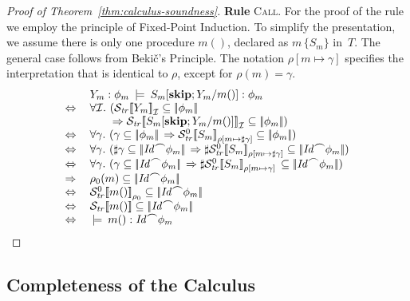 \documentclass[10pt,a4paper]{amsart}
\theoremstyle{definition}
\newcommand{\denot}[1]{\left[\!\left[#1\right]\!\right]}
\newcommand{\fdenot}[1]{\left|\!\left|#1\right|\!\right|}
\newcommand{\trcdenot}[1]{\mathcal{S}_{\mathit{tr}}\!\denot{#1}}
\newcommand{\trcdenoth}[1]{\mathcal{S}^0_{\mathit{tr}}\!\denot{#1}}
\newcommand{\trcdenoti}[1]{\mathcal{S}_{\mathit{tr}}\!\denot{#1}_{\mathcal{I}}}
\newcommand{\chop}[0]{\raisebox{1ex}{$\frown$}}
\newcommand{\Skip}{\mbox{\bf skip}}
\newcommand{\judge}[2]{#1 : #2}
\newcommand{\semsequent}[2]{#1 \>\models\> #2}
\begin{document}
\begin{proof}[Proof of Theorem~\ref{thm:calculus-soundness}]
\noindent\textbf{Rule} \textsc{Call}.
%
For the proof of the rule we employ the principle of Fixed-Point
Induction. %
%
To simplify the presentation, we assume there is only one procedure
$m()$, declared as $m\, \{S_m\}$ in~$T$.
%
The general case follows from Beki\v{c}'s Principle. The notation
$\rho [m\mapsto\gamma]$ specifies the interpretation that is identical
to $\rho$, except for $\rho(m)=\gamma$.
%
%
\[
  \begin{array}{ll}
   & 
   \semsequent{Y_m : \phi_m}{\judge{S_m [\Skip; Y_m / m()]}{\phi_m}} \\
   \Leftrightarrow\> & 
   \forall \mathcal{I}.\
                       (\trcdenoti{Y_m} \subseteq \fdenot{\phi_m}\,\\
    & \qquad\Rightarrow 
       \trcdenoti{S_m [\Skip; Y_m / m()]} \subseteq \fdenot{\phi_m}) \\
   \Leftrightarrow\> & 
   \forall \gamma.\
      (\gamma \subseteq \fdenot{\phi_m}\, \Rightarrow 
       \trcdenoth{S_m}_{\rho [m \mapsto \sharp \gamma]} 
       \subseteq \fdenot{\phi_m}) \\
   \Leftrightarrow\> & 
   \forall \gamma.\
      (\sharp \gamma \subseteq \fdenot{\mathit{Id} \chop \phi_m}\, \Rightarrow 
       \sharp \trcdenoth{S_m}_{\rho [m \mapsto \sharp \gamma]} 
       \subseteq \fdenot{\mathit{Id} \chop \phi_m}) \\
   \Leftrightarrow\> & 
   \forall \gamma.\
      (\gamma \subseteq \fdenot{\mathit{Id} \chop \phi_m}\, \Rightarrow 
       \sharp \trcdenoth{S_m}_{\rho [m \mapsto \gamma]}\, 
       \subseteq \fdenot{\mathit{Id} \chop \phi_m}) \\
   \Rightarrow\> & 
   \rho_0 (m) \subseteq \fdenot{\mathit{Id} \chop \phi_m} \\
   \Leftrightarrow\> & 
   \trcdenoth{m()}_{\rho_0} \subseteq \fdenot{\mathit{Id}\chop\phi_m} \\
   \Leftrightarrow\> & 
   \trcdenot{m()} \subseteq \fdenot{\mathit{Id}\chop\phi_m} \\
   \Leftrightarrow\> & 
   \semsequent{}{\judge{m()}{\mathit{Id}\chop\phi_m}} 
  \end{array}
\]
\end{proof}

\subsection{Completeness of the Calculus}
\label{sec:completeness-app}
\end{document}
